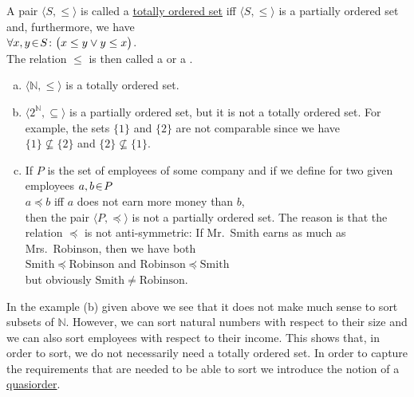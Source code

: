 \begin{Definition} 
  A pair $\langle S, \leq \rangle$ is called a   \href{http://en.wikipedia.org/wiki/Totally_ordered_set}{totally ordered set} 
  iff  $\langle S, \leq \rangle$ is a partially ordered set
  and, furthermore, we have
  \\[0.2cm]
  \hspace*{1.3cm}
  $\forall x, y \!\in\! S \colon\bigl( x \leq y \vee y \leq x\bigr)$.
  \\[0.2cm]
  The relation $\leq$ is then called a  or a . \eox
\end{Definition}

\examples
\begin{enumerate}[(a)]
\item $\langle\mathbb{N}, \leq \rangle$ is a totally ordered set.
\item $\langle 2^{\mathbb{N}}, \subseteq \rangle$ is a partially ordered set, but it is not a totally
      ordered set.  For example, the sets $\{1\}$ and $\{2\}$ are not comparable since we have
      \\[0.2cm]
      \hspace*{1.3cm}
      $\{1\} \not\subseteq \{2\}$ \quad and \quad  $\{2\} \not\subseteq \{1\}$.
\item If $P$ is the set of employees of some company and if we define for two given employees
      $a,b \!\in\! P$
      \\[0.2cm]
      \hspace*{1.3cm}
      $a \preceq b$ \quad iff \quad  $a$ does not earn more money than $b$, 
      \\[0.2cm]
      then the pair $\langle P, \preceq \rangle$ is not a partially ordered set.  The reason is that
      the relation $\preceq$ is not anti-symmetric:  If Mr.~Smith earns as much as
      Mrs.~Robinson, then we have both
      \\[0.2cm]
      \hspace*{1.3cm}
      $\mathrm{Smith} \preceq \mathrm{Robinson}$ \quad and \quad $\mathrm{Robinson} \preceq \mathrm{Smith}$
      \\[0.2cm]
      but obviously $\mathrm{Smith} \not= \mathrm{Robinson}$.
\end{enumerate}
In the example (b) given above we see that it does not make much sense to sort subsets of $\mathbb{N}$.
However, we can sort natural numbers with respect to their size and we can also sort employees with
respect to their income.  This shows that, in order to sort,  we do not necessarily need a totally
ordered set.  In order to capture the requirements that are needed to be able to sort we introduce
the notion of a \href{http://en.wikipedia.org/wiki/Preorder}{quasiorder}.

